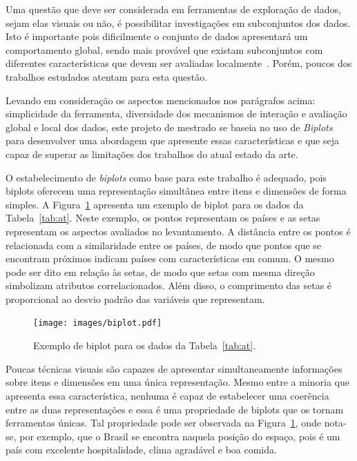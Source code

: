 Uma questão que deve ser considerada em ferramentas de
exploração de dados, sejam elas visuais ou não, é
possibilitar investigações em subconjuntos dos dados. Isto é
importante pois dificilmente o conjunto de dados apresentará
um comportamento global, sendo mais provável que existam
subconjuntos com diferentes características que devem ser
avaliadas localmente~\cite{May2011}. Porém, poucos dos
trabalhos estudados atentam para esta questão.

Levando em consideração os aspectos mencionados nos
parágrafos acima: simplicidade da ferramenta, diversidade
dos mecanismos de interação e avaliação global e local dos
dados, este projeto de mestrado se baseia no uso de
\emph{Biplots}~\cite{Gabriel1971} para desenvolver uma
abordagem que apresente essas características e que seja
capaz de superar as limitações dos trabalhos do atual estado
da arte.

O estabelecimento de \emph{biplots} como base para este trabalho é
adequado, pois biplots oferecem uma representação simultânea
entre itens e dimensões de forma simples. A
Figura~\ref{fig:biplot} apresenta um exemplo de biplot para
os dados da Tabela~\ref{tab:at}.
Neste exemplo, os pontos representam os países e as setas
representam os aspectos avaliados no levantamento. A
distância entre os pontos é relacionada com a similaridade
entre os países, de modo que pontos que se encontram
próximos indicam países com características em comum. O
mesmo pode ser dito em relação às setas, de modo que setas
com mesma direção simbolizam atributos correlacionados. Além
disso, o comprimento das setas é proporcional ao desvio
padrão das variáveis que representam.

\begin{figure}[h!]
    \centering
    \texttt{[image: images/biplot.pdf]}
    \caption{Exemplo de biplot para os dados da
    Tabela~\ref{tab:at}.}
    \label{fig:biplot}
\end{figure}

Poucas técnicas visuais são capazes de apresentar
simultaneamente informações sobre itens e dimensões em uma
única representação. Mesmo entre a minoria que apresenta
essa característica, nenhuma é capaz de estabelecer uma
coerência entre as duas representações e essa é uma
propriedade de biplots que os tornam ferramentas únicas. Tal
propriedade pode ser observada na Figura~\ref{fig:biplot},
onde nota-se, por exemplo, que o Brasil se encontra naquela
posição do espaço, pois é um país com excelente
hospitalidade, clima agradável e boa comida. 

